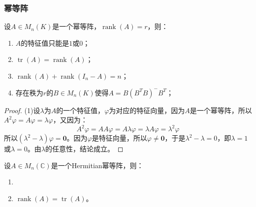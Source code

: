 \subsubsection{幂等阵}
\begin{property}
	设$A\in M_{n}(K)$是一个幂等阵，$\operatorname{rank}(A)=r$，则：
	\begin{enumerate}
		\item $A$的特征值只能是$1$或$0$；
		\item $\operatorname{tr}(A)=\operatorname{rank}(A)$；
		\item $\operatorname{rank}(A)+\operatorname{rank}(I_n-A)=n$；
		\item 存在秩为$r$的$B\in M_{n}(K)$使得$A=B(B^TB)^-B^T$；
	\end{enumerate}
\end{property}
\begin{proof}
	(1)设$\lambda$为$A$的一个特征值，$\varphi$为对应的特征向量，因为$A$是一个幂等阵，所以$A^2\varphi=A\varphi=\lambda\varphi$，又因为：
	\begin{equation*}
		A^2\varphi=AA\varphi=A\lambda\varphi=\lambda A\varphi=\lambda^2\varphi
	\end{equation*}
	所以$(\lambda^2-\lambda)\varphi=\mathbf{0}$。因为$\varphi$是特征向量，所以$\varphi\ne\mathbf{0}$，于是$\lambda^2-\lambda=0$，即$\lambda=1$或$\lambda=0$。由$\lambda$的任意性，结论成立。\par
\end{proof}
\begin{property}\label{prop:HermitianIdempotent}
	设$A\in M_{n}(\mathbb{C})$是一个Hermitian幂等阵，则：
	\begin{enumerate}
		\item 
		\item $\operatorname{rank}(A)=\operatorname{tr}(A)$。
	\end{enumerate}
\end{property}

